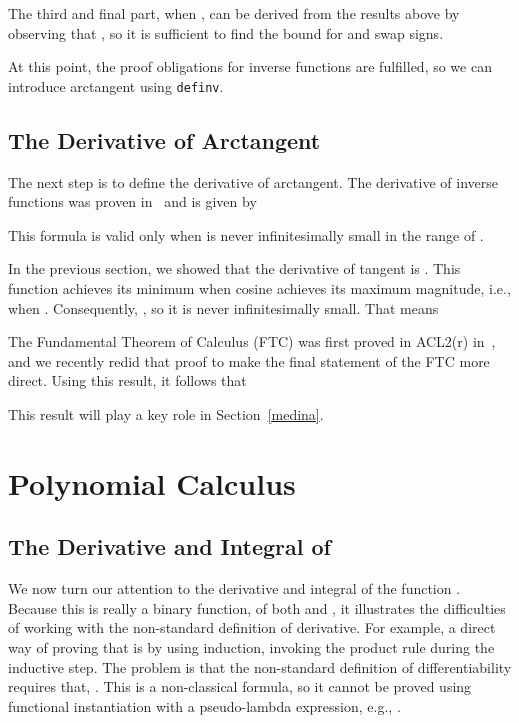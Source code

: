 \documentclass[copyright,creativecommons]{eptcs}
\begin{document}
The third and final part, when , can be derived from the results
above by observing that , so it is sufficient to
find the bound for  and swap signs.

At this point, the proof obligations for inverse functions are
fulfilled, so we can introduce arctangent using \texttt{definv}.

\subsection{The Derivative of Arctangent}

The next step is to define the derivative of arctangent. The
derivative of inverse functions was proven in~\cite{GaCo:chain-rule}
and is given by 

This formula is valid only when  is never infinitesimally small in
the range of .

In the previous section, we showed that the derivative of tangent is
.  This function achieves its minimum when
cosine achieves its maximum magnitude, i.e., when . Consequently, , so it is never infinitesimally
small. That means


The Fundamental Theorem of Calculus (FTC) was first proved in ACL2(r)
in~\cite{Kau:ftc}, and we recently redid that proof to make the final
statement of the FTC more direct. Using this result, it follows that

This result will play a key role in Section~\ref{medina}.

\section{Polynomial Calculus}
\label{polys}

\subsection{The Derivative and Integral of }

We now turn our attention to the derivative and integral of the
function . Because this is really a binary function, of both
 and , it illustrates the difficulties of working with the
non-standard definition of derivative.  For example, a direct way of
proving that  is by using
induction, invoking the product rule during the inductive step. The
problem is that the non-standard definition of differentiability
requires that, . This is a non-classical
formula, so it cannot be proved using functional instantiation with a
pseudo-lambda expression, e.g., .
\end{document}
